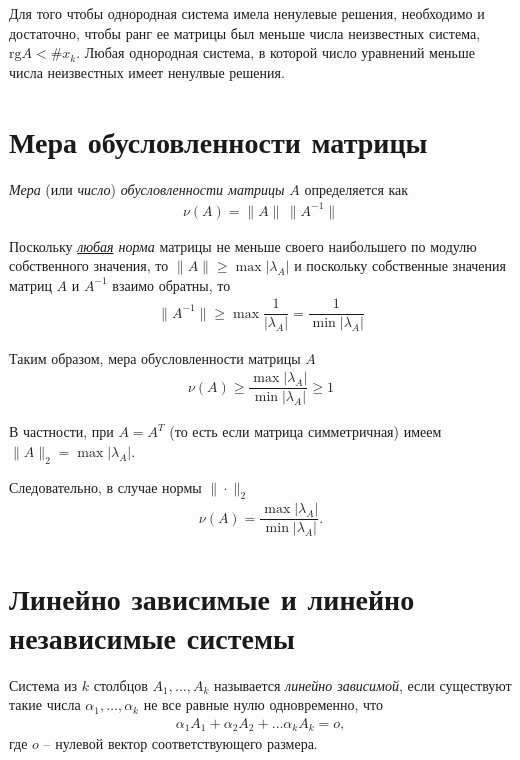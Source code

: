 \documentclass[%
	11pt,
	a4paper,
	utf8,
		]{article}
\begin{document}
Для того чтобы однородная система имела ненулевые решения, необходимо и достаточно, чтобы ранг ее матрицы был меньше числа неизвестных система, $ \text{rg} A < \#x_k $. Любая однородная система, в которой число уравнений меньше числа неизвестных имеет ненулвые решения.




\section{Мера обусловленности матрицы}

\emph{Мера} (или \emph{число}) \emph{обусловленности матрицы} $ A $ определяется как \cite[]{bahvalov:num_methods}
\begin{align*}
	\nu(A) = \| A \| \, \| A^{-1} \|
\end{align*}
 
Поскольку \emph{\underline{любая} норма} матрицы не меньше своего наибольшего по модулю собственного значения, то $ \| A \| \geqslant \max | \lambda_A | $ и поскольку собственные значения матриц $ A $ и $ A^{-1} $ взаимо обратны, то
\begin{align*}
	\| A^{-1} \| \geqslant \max \dfrac{1}{ | \lambda_A | } = \dfrac{1}{ \min | \lambda_A | }
\end{align*}

Таким образом, мера обусловленности матрицы $ A $
\begin{align*}
	\boxed{\nu(A) \geqslant \dfrac{\max | \lambda_A |}{ \min | \lambda_A | } \geqslant 1}
\end{align*}

В частности, при $ A = A^T $ (то есть если матрица симметричная) имеем $ \| A \|_2 = \max | \lambda_A | $.

Следовательно, в случае нормы $ \| \cdot \|_2 $
\begin{align*}
	\nu(A) = \dfrac{ \max | \lambda_A | }{ \min | \lambda_A | }.
\end{align*}


\section{Линейно зависимые и линейно независимые системы}

Система из $ k $ столбцов $ A_1, \ldots, A_k $ называется \emph{линейно зависимой}, если существуют такие числа $ \alpha_1, \ldots, \alpha_k $ не все равные нулю одновременно, что \cite[]{bortakovskiy:2005}
\begin{align*}
	\alpha_1 A_1 + \alpha_2 A_2 + \ldots \alpha_k A_k = o,
\end{align*}
где $ o $ -- нулевой вектор соответствующего размера.
\end{document}
